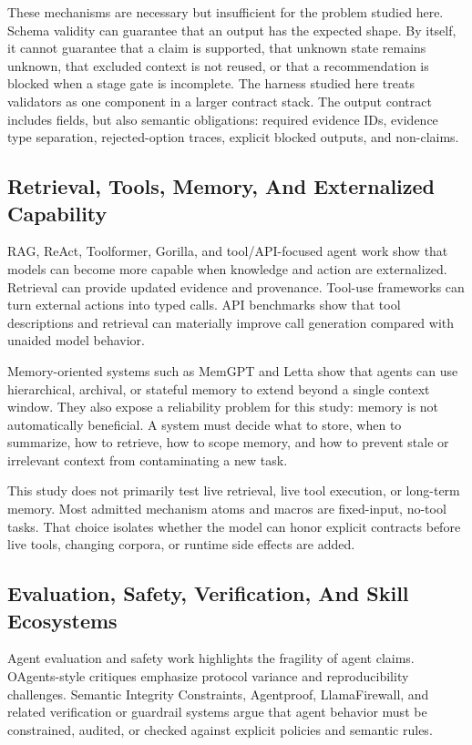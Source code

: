 \documentclass[11pt]{article}
\begin{document}
These mechanisms are necessary but insufficient for the problem studied here. Schema validity can guarantee that an output has the expected shape. By itself, it cannot guarantee that a claim is supported, that unknown state remains unknown, that excluded context is not reused, or that a recommendation is blocked when a stage gate is incomplete. The harness studied here treats validators as one component in a larger contract stack. The output contract includes fields, but also semantic obligations: required evidence IDs, evidence type separation, rejected-option traces, explicit blocked outputs, and non-claims.

\subsection{Retrieval, Tools, Memory, And Externalized Capability}

RAG, ReAct, Toolformer, Gorilla, and tool/API-focused agent work show that models can become more capable when knowledge and action are externalized. Retrieval can provide updated evidence and provenance. Tool-use frameworks can turn external actions into typed calls. API benchmarks show that tool descriptions and retrieval can materially improve call generation compared with unaided model behavior. \cite{P2_EXT_RAG,P2_EXT_REACT,P2_EXT_TOOLFORMER,P2_EXT_GORILLA}

Memory-oriented systems such as MemGPT and Letta show that agents can use hierarchical, archival, or stateful memory to extend beyond a single context window. They also expose a reliability problem for this study: memory is not automatically beneficial. A system must decide what to store, when to summarize, how to retrieve, how to scope memory, and how to prevent stale or irrelevant context from contaminating a new task. \cite{P2_EXT_MEMGPT,P2_EXT_LETTA}

This study does not primarily test live retrieval, live tool execution, or long-term memory. Most admitted mechanism atoms and macros are fixed-input, no-tool tasks. That choice isolates whether the model can honor explicit contracts before live tools, changing corpora, or runtime side effects are added.

\subsection{Evaluation, Safety, Verification, And Skill Ecosystems}

Agent evaluation and safety work highlights the fragility of agent claims. OAgents-style critiques emphasize protocol variance and reproducibility challenges. Semantic Integrity Constraints, Agentproof, LlamaFirewall, and related verification or guardrail systems argue that agent behavior must be constrained, audited, or checked against explicit policies and semantic rules. \cite{P2_EXT_OAGENTS,P2_EXT_SIC,P2_EXT_AGENTPROOF,P2_EXT_LLAMAFIREWALL}
\end{document}
